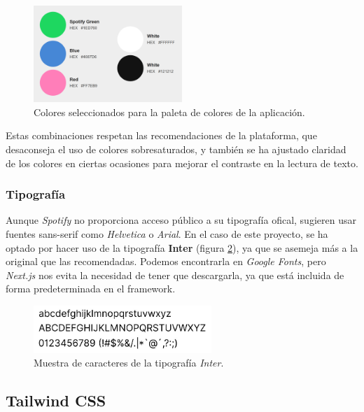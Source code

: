 \begin{figure}[H]
    \centering
    \includegraphics[width=0.5\textwidth]{figures/colores_usados.png}
    \caption{Colores seleccionados para la paleta de colores de la aplicación.}
    \label{fig:colores_usados}
\end{figure}

Estas combinaciones respetan las recomendaciones de la plataforma, que desaconseja el uso de colores sobresaturados, y también se ha ajustado claridad de los colores en ciertas ocasiones para mejorar el contraste en la lectura de texto.

\subsubsection*{Tipografía}

Aunque \textit{Spotify} no proporciona acceso público a su tipografía ofical, sugieren usar fuentes sans-serif como \textit{Helvetica} o \textit{Arial}. En el caso de este proyecto, se ha optado por hacer uso de la tipografía \textbf{Inter} (figura \ref{fig:inter_fuente}), ya que se asemeja más a la original que las recomendadas. Podemos encontrarla en \textit{Google Fonts}, pero \textit{Next.js} nos evita la necesidad de tener que descargarla, ya que está incluida de forma predeterminada en el framework.

\begin{figure}[H]
    \centering
    \includegraphics[width=0.6\textwidth]{figures/inter_fuente.png}
    \caption{Muestra de caracteres de la tipografía \textit{Inter}.}
    \label{fig:inter_fuente}
\end{figure}

\subsection{Tailwind CSS}

